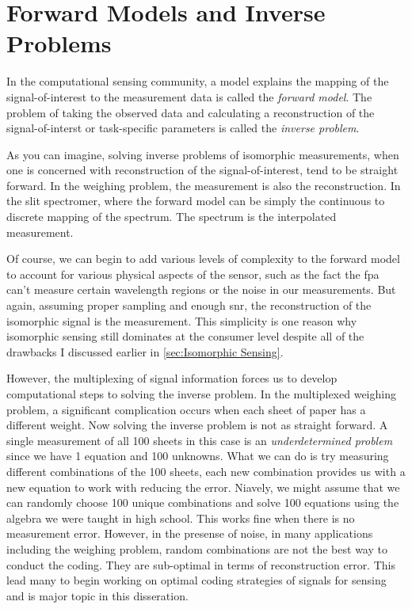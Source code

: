 \section{Forward Models and Inverse Problems}

In the computational sensing community, a model explains the mapping of the signal-of-interest to the measurement data is called the \emph{forward model}. The problem of taking the observed data and calculating a reconstruction of the signal-of-interst or task-specific parameters is called the \emph{inverse problem}.

As you can imagine, solving inverse problems of isomorphic measurements, when one is concerned with reconstruction of the signal-of-interest, tend to be straight forward. In the weighing problem, the measurement is also the reconstruction. In the slit spectromer, where the forward model can be simply the continuous to discrete mapping of the spectrum. The spectrum is the interpolated measurement. 

Of course, we can begin to add various levels of complexity to the forward model to account for various physical aspects of the sensor, such as the fact the \gls{fpa} can't measure certain wavelength regions or the noise in our measurements. But again, assuming proper sampling and enough \gls{snr}, the reconstruction of the isomorphic signal is the measurement. This simplicity is one reason why isomorphic sensing still dominates at the consumer level despite all of the drawbacks I discussed earlier in \autoref{sec:Isomorphic Sensing}. 

However, the multiplexing of signal information forces us to develop computational steps to solving the inverse problem. In the multiplexed weighing problem, a significant complication occurs when each sheet of paper has a different weight. Now solving the inverse problem is not as straight forward. A single measurement of all 100 sheets in this case is an \emph{underdetermined problem} since we have 1 equation and 100 unknowns. What we can do is try measuring different combinations of the 100 sheets, each new combination provides us with a new equation to work with reducing the error. Niavely, we might assume that we can randomly choose 100 unique combinations and solve 100 equations using the algebra we were taught in high school. This works fine when there is no measurement error. However, in the presense of noise, in many applications including the weighing problem, random combinations are not the best way to conduct the coding. They are sub-optimal in terms of reconstruction error. This lead many to begin working on optimal coding strategies of signals for sensing and is major topic in this disseration.

